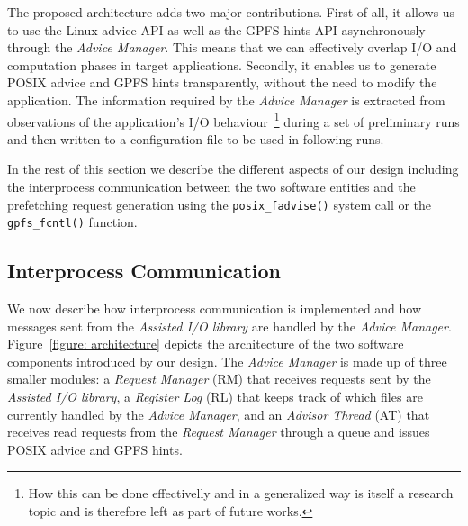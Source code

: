 The proposed architecture adds two major contributions. First of all, it allows us to use the Linux advice API as well as the GPFS hints API asynchronously through the \textit{Advice Manager}. This means that we can effectively overlap I/O and computation phases in target applications. Secondly, it enables us to generate POSIX advice and GPFS hints transparently, without the need to modify the application. The information required by the \textit{Advice Manager} is extracted from observations of the application's I/O behaviour~\footnote{How this can be done effectivelly and in a generalized way is itself a research topic and is therefore left as part of future works.} during a set of preliminary runs and then written to a configuration file to be used in following runs.

In the rest of this section we describe the different aspects of our design including the interprocess communication between the two software entities and the prefetching request generation using the \texttt{posix\_fadvise()} system call or the \texttt{gpfs\_fcntl()} function.

\subsection{Interprocess Communication}
\label{subsec: interprocess_comm}
We now describe how interprocess communication is implemented and how messages sent from the \textit{Assisted I/O library} are handled by the \textit{Advice Manager}. Figure~\ref{figure: architecture} depicts the architecture of the two software components introduced by our design. The \textit{Advice Manager} is made up of three smaller modules: a \textit{Request Manager} (RM) that receives requests sent by the \textit{Assisted I/O library}, a \textit{Register Log} (RL) that keeps track of which files are currently handled by the \textit{Advice Manager}, and an \textit{Advisor Thread} (AT) that receives read requests from the \textit{Request Manager} through a queue and issues POSIX advice and GPFS hints.

